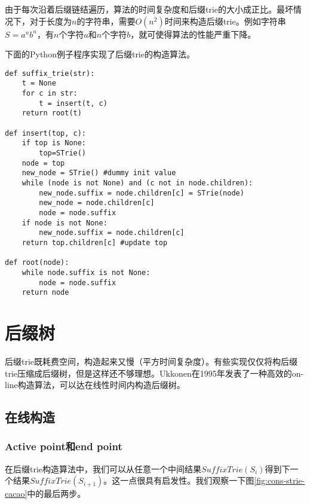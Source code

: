 \documentclass[UTF8]{article}
\begin{document}
由于每次沿着后缀链结遍历，算法的时间复杂度和后缀trie的大小成正比。最坏情况下，对于长度为$n$的字符串，需要$O(n^2)$时间来构造后缀trie。例如字符串$S=a^nb^n$，有$n$个字符$a$和$n$个字符$b$，就可使得算法的性能严重下降。

下面的Python例子程序实现了后缀trie的构造算法。

\lstset{language=Python}
\begin{lstlisting}
def suffix_trie(str):
    t = None
    for c in str:
        t = insert(t, c)
    return root(t)

def insert(top, c):
    if top is None:
        top=STrie()
    node = top
    new_node = STrie() #dummy init value
    while (node is not None) and (c not in node.children):
        new_node.suffix = node.children[c] = STrie(node)
        new_node = node.children[c]
        node = node.suffix
    if node is not None:
        new_node.suffix = node.children[c]
    return top.children[c] #update top

def root(node):
    while node.suffix is not None:
        node = node.suffix
    return node
\end{lstlisting}

\section{后缀树}

后缀trie既耗费空间，构造起来又慢（平方时间复杂度）。有些实现仅仅将构后缀trie压缩成后缀树\cite{trivial-stree-java}，但是这样还不够理想。Ukkonen在1995年发表了一种高效的on-line构造算法，可以达在线性时间内构造后缀树。

\subsection{在线构造}

\subsubsection{Active point和end point}
\label{ap-and-ep}

在后缀trie构造算法中，我们可以从任意一个中间结果$SuffixTrie(S_i)$得到下一个结果$SuffixTrie(S_{i+1})$。这一点很具有启发性。我们观察一下图\ref{fig:cons-strie-cacao}中的最后两步。
\end{document}
